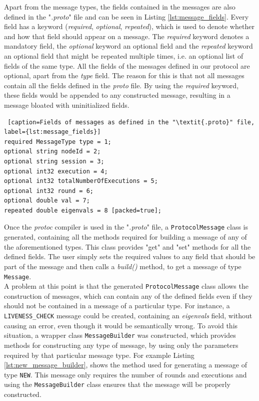 \documentclass[a4paper,11pt,twoside]{report}
\newcommand{\classname}[1]{\texttt{#1}}
\begin{document}
Apart from the message types, the fields contained in the messages are also defined in the "\textit{.proto}" file and can be seen in Listing \ref{lst:message_fields}. Every field has a keyword (\textit{required}, \textit{optional}, \textit{repeated}), which is used to denote whether and how that field should appear on a message. The \textit{required} keyword denotes a mandatory field, the \textit{optional} keyword an optional field and the \textit{repeated} keyword an optional field that might be repeated multiple times, i.e. an optional list of fields of the same type. All the fields of the messages defined in our protocol are optional, apart from the \textit{type} field. The reason for this is that not all messages contain all the fields defined in the \textit{proto} file. By using the \textit{required} keyword, these fields would be appended to any constructed message, resulting in a message bloated with uninitialized fields. 
	
\begin{lstlisting} [caption=Fields of messages as defined in the "\textit{.proto}" file, label={lst:message_fields}]
required MessageType type = 1;
optional string nodeId = 2;
optional string session = 3;
optional int32 execution = 4;
optional int32 totalNumberOfExecutions = 5;
optional int32 round = 6;
optional double val = 7;
repeated double eigenvals = 8 [packed=true];
\end{lstlisting}

Once the \textit{protoc} compiler is used in the "\textit{.proto}" file, a \classname{ProtocolMessage} class is generated, containing all the methods required for building a message of any of the aforementioned types. This class provides "get" and "set" methods for all the defined fields. The user simply sets the required values to any field that should be part of the message and then calls a \textit{build()} method, to get a message of type \classname{Message}.\\


A problem at this point is that the generated \classname{ProtocolMessage} class allows the construction of messages, which can contain any of the defined fields even if they should not be contained in a message of a particular type. For instance, a \classname{LIVENESS\_CHECK} message could be created, containing an \textit{eigenvals} field, without causing an error, even though it would be semantically wrong. To avoid this situation, a wrapper class \classname{MessageBuilder} was constructed, which provides methods for constructing any type of message, by using only the parameters required by that particular message type. For example Listing \ref{lst:new_message_builder}, shows the method used for generating a message of type \classname{NEW}. This message only requires the number of rounds and executions and using the \classname{MessageBuilder} class ensures that the message will be properly constructed.
\end{document}
